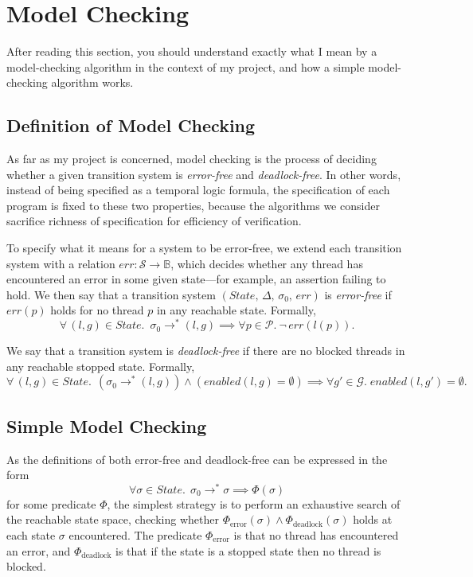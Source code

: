 \documentclass[12pt,a4paper,twoside,openany]{report}
\begin{document}
\section{Model Checking}
After reading this section, you should
understand exactly what I mean by a
model-checking algorithm in the context
of my project, and how a simple
model-checking algorithm works.

\subsection{Definition of Model Checking}
\label{sec:model-checking-dfn}
As far as my project is concerned,
model checking is the process of deciding
whether a
given transition system is \emph{error-free} and
\emph{deadlock-free}. In other words, instead of
being specified as a temporal logic formula,
the specification of each program is fixed
to these two properties, because the algorithms we
consider sacrifice richness of specification
for efficiency of verification.

To specify what it means for a system to
be error-free, we extend each transition system
with a relation
$\textit{err} : \mathcal{S} \to \mathbb{B}$, which decides
whether any thread has encountered an
error in some given state---for example,
an assertion failing to hold.
We then say that a transition system
$(\textit{State},\, \Delta,\, \sigma_0,\, \textit{err})$
is
\emph{error-free} if
$\textit{err}(p)$ holds for no
thread $p$ in any reachable state.
Formally,
\[
	\forall\, (l, g) \in \textit{State}.\; \ \sigma_0 \longrightarrow^* (l, g)
	\implies \forall p \in \mathcal{P}.\ \neg\,\textit{err}(l(p)).
\]

We say that a transition system
is \textit{deadlock-free} if
there are no
blocked threads in any reachable
stopped state.
Formally,
\[
	\forall\, (l, g) \in \textit{State}. \;\, (\sigma_0
	 \longrightarrow^* (l, g))
	\wedge (\textit{enabled}(l, g) = \emptyset)
	\implies \forall g' \in \mathcal{G}. \;
		\textit{enabled}(l, g') = \emptyset.
\]

\subsection{Simple Model Checking}
\label{sec:simple-prep}
As the definitions of both error-free and deadlock-free
can be expressed in the form
\[
	\forall \sigma \in \textit{State}.\;\, \sigma_0 \longrightarrow^* \sigma
	\implies \Phi (\sigma)
\]
for some predicate $\Phi$, the simplest strategy is to
perform an exhaustive search of the reachable state space,
checking whether $\Phi_\text{error}(\sigma) \wedge
\Phi_\text{deadlock}(\sigma)$
holds at each state $\sigma$ encountered.
The predicate $\Phi_\text{error}$ is that
no thread has encountered an error,
and $\Phi_\text{deadlock}$ is
that if the state is a stopped state then no
thread is blocked.
\end{document}
